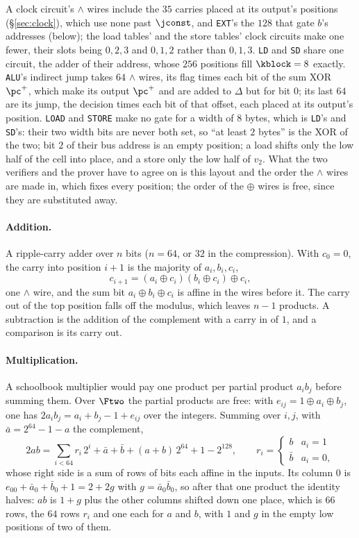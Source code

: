 A clock circuit's $\wedge$ wires include the $35$ carries placed at its output's positions (\S\ref{sec:clock}), which use none past $\jconst$, and \texttt{EXT}'s the $128$ that gate $b$'s addresses (below); the load tables' and the store tables' clock circuits make one fewer, their slots being $0,2,3$ and $0,1,2$ rather than $0,1,3$. \texttt{LD} and \texttt{SD} share one circuit, the adder of their address, whose $256$ positions fill $\kblock=8$ exactly. \texttt{ALU}'s indirect jump takes $64$ $\wedge$ wires, its flag times each bit of the sum XOR $\pc^{+}$, which make its output $\pc^{+}$ and are added to $\Delta$ but for bit $0$; its last $64$ are its jump, the decision times each bit of that offset, each placed at its output's position. \texttt{LOAD} and \texttt{STORE} make no gate for a width of $8$ bytes, which is \texttt{LD}'s and \texttt{SD}'s: their two width bits are never both set, so ``at least $2$ bytes'' is the XOR of the two; bit $2$ of their bus address is an empty position; a load shifts only the low half of the cell into place, and a store only the low half of $v_2$.
What the two verifiers and the prover have to agree on is this layout and the order the $\wedge$ wires are made in, which fixes every position; the order of the $\oplus$ wires is free, since they are substituted away.

\paragraph{Addition.} A ripple-carry adder over $n$ bits ($n=64$, or $32$ in the compression). With $c_0=0$, the carry into position $i+1$ is the majority of $a_i,b_i,c_i$,
\[
c_{i+1}=(a_i\oplus c_i)(b_i\oplus c_i)\oplus c_i ,
\]
one $\wedge$ wire, and the sum bit $a_i\oplus b_i\oplus c_i$ is affine in the wires before it. The carry out of the top position falls off the modulus, which leaves $n-1$ products. A subtraction is the addition of the complement with a carry in of $1$, and a comparison is its carry out.

\paragraph{Multiplication.} A schoolbook multiplier would pay one product per partial product $a_ib_j$ before summing them. Over $\Ftwo$ the partial products are free: with $e_{ij}=1\oplus a_i\oplus b_j$, one has $2a_ib_j=a_i+b_j-1+e_{ij}$ over the integers. Summing over $i,j$, with $\bar a=2^{64}-1-a$ the complement,
\[
2ab=\sum_{i<64}r_i\,2^{i}+\bar a+\bar b+(a+b)\,2^{64}+1-2^{128},\qquad r_i=\begin{cases}b&a_i=1\\ \bar b&a_i=0,\end{cases}
\]
whose right side is a sum of rows of bits each affine in the inputs. Its column $0$ is $e_{00}+\bar a_0+\bar b_0+1=2+2g$ with $g=\bar a_0\bar b_0$, so after that one product the identity halves: $ab$ is $1+g$ plus the other columns shifted down one place, which is $66$ rows, the $64$ rows $r_i$ and one each for $a$ and $b$, with $1$ and $g$ in the empty low positions of two of them.

